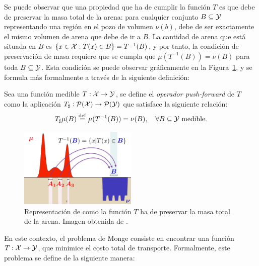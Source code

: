 {{	  Se puede observar que una propiedad que ha de cumplir la función $T$ es que debe de preservar la masa total de la arena: para cualquier conjunto $B \subseteq \cY$ representando una región en el pozo de volumen $\nu(b)$, debe de ser exactamente el mismo volumen de arena que debe de ir a $B$. La cantidad de arena que está situada en $B$ es $\left\{ x \in \cX : T(x) \in B \right\} = T^{-1}(B)$, y por tanto, la condición de preservación de masa requiere que se cumpla que $\mu(T^{-1}(B)) = \nu(B)$ para toda $B \subseteq \cY$. Esta condición se puede observar gráficamente en la Figura~\ref{fig:preservacion-masa}, y se formula más formalmente a través de la siguiente definición:

	  \begin{definition}
		  Sea una función medible $T:\cX \to \cY$, se define el \emph{operador push-forward}  de $T$ como la aplicación $\Tpf:\ProbSpace[\cX] \to \ProbSpace[\cY]$ que satisface la siguiente relación:
		  \begin{equation}
			  \label{eq:pushForward}
			  \Tpf \mu(B) \eqdef \mu (T^{-1}(B)) = \nu(B),\quad \forall B \subseteq \cY \text{ medible}.
		  \end{equation}
	  \end{definition}

	  \begin{figure}[ht]
		  \centering
		  \includegraphics[width=0.5\textwidth]{img/transporte/preservacion-masa.png}
		  \caption{Representación de como la función $T$ ha de preservar la masa total de la arena. Imagen obtenida de \cite{cuturi2017primer}.}
		  \label{fig:preservacion-masa}
	  \end{figure}

	  En este contexto, el problema de Monge consiste en encontrar una función $T: \cX \to \cY$, que minimice el costo total de transporte. Formalmente, este problema se define de la siguiente manera:

}}
